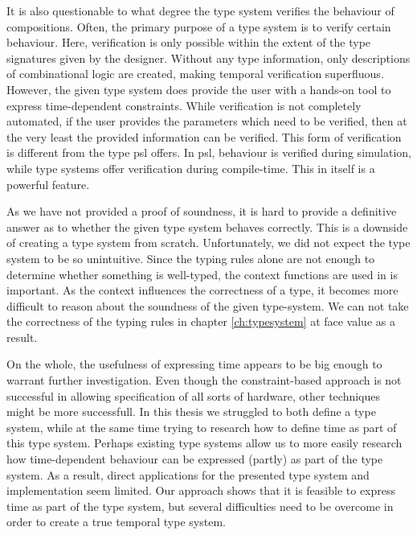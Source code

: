 It is also questionable to what degree the type system verifies the behaviour of compositions.
Often, the primary purpose of a type system is to verify certain behaviour.
Here, verification is only possible within the extent of the type signatures given by the designer.
Without any type information, only descriptions of combinational logic are created, making temporal verification superfluous.
However, the given type system does provide the user with a hands-on tool to express time-dependent constraints.
While verification is not completely automated, if the user provides the parameters which need to be verified, then at the very least the provided information can be verified.
This form of verification is different from the type \gls{psl} offers.
In \gls{psl}, behaviour is verified during simulation, while type systems offer verification during compile-time.
This in itself is a powerful feature.

As we have not provided a proof of soundness, it is hard to provide a definitive answer as to whether the given type system behaves correctly.
This is a downside of creating a type system from scratch.
Unfortunately, we did not expect the type system to be so unintuitive.
Since the typing rules alone are not enough to determine whether something is well-typed, the context functions are used in is important.
As the context influences the correctness of a type, it becomes more difficult to reason about the soundness of the given type-system.
We can not take the correctness of the typing rules in chapter \ref{ch:typesystem} at face value as a result.

On the whole, the usefulness of expressing time appears to be big enough to warrant further investigation.
Even though the constraint-based approach is not successful in allowing specification of all sorts of hardware, other techniques might be more successfull.
In this thesis we struggled to both define a type system, while at the same time trying to research how to define time as part of this type system.
Perhaps existing type systems allow us to more easily research how time-dependent behaviour can be expressed (partly) as part of the type system.
As a result, direct applications for the presented type system and implementation seem limited.
Our approach shows that it is feasible to express time as part of the type system, but several difficulties need to be overcome in order to create a true temporal type system.


